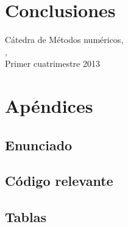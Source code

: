 \documentclass[%
	compressed,
	titlepage,
	narroweqnarray,
	inline,
	twoside,
	]{ieee}
\begin{document}


\section{Conclusiones}




\begin{thebibliography}{1}

C\'atedra de M\'etodos num\'ericos,\\
,\\
\newblock Primer cuatrimestre 2013

\end{thebibliography}


\newpage

\section{Ap\'endices}

\subsection{Enunciado}


\newpage

\subsection{C\'odigo relevante}


\newpage

\subsection{Tablas}


\end{document}
